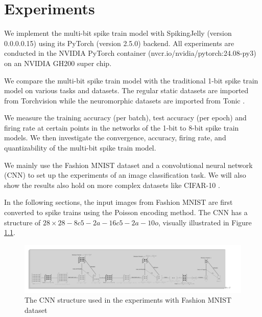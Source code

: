 \chapter{Experiments}
\label{chap:experiments}
We implement the multi-bit spike train model with SpikingJelly \cite{doi:10.1126/sciadv.adi1480} (version 0.0.0.0.15) using its PyTorch \cite{NEURIPS2019_9015} (version 2.5.0) backend. All experiments are conducted in the NVIDIA PyTorch container (nvcr.io/nvidia/pytorch:24.08-py3) on an NVIDIA GH200 super chip. 

We compare the multi-bit spike train model with the traditional 1-bit spike train model on various tasks and datasets. The regular static datasets are imported from Torchvision \cite{10.1145/1873951.1874254} while the neuromorphic datasets are imported from Tonic \cite{lenz_2021_5079802}. 

We measure the training accuracy (per batch), test accuracy (per epoch) and firing rate at certain points in the networks of the 1-bit to 8-bit spike train models. We then investigate the convergence, accuracy, firing rate, and quantizability of the multi-bit spike train model. 


We mainly use the Fashion MNIST dataset \cite{xiao2017/online} and a convolutional neural network (CNN) to set up the experiments of an image classification task. We will also show the results also hold on more complex datasets like CIFAR-10 \cite{Krizhevsky2009}. 

In the following sections, the input images from Fashion MNIST are first converted to spike trains using the Poisson encoding method. The CNN has a structure of $28\times 28 - 8c5 - 2a - 16c5 - 2a - 10o$, visually illustrated in Figure \ref{fig:scnn_structure}. 

\begin{figure}[!htpb]
    \centering
    \includegraphics[width=\textwidth]{assets/standard/FashionMNIST/snn.pdf}
    \caption{The CNN structure used in the experiments with Fashion MNIST dataset}
    \label{fig:scnn_structure}
\end{figure}

